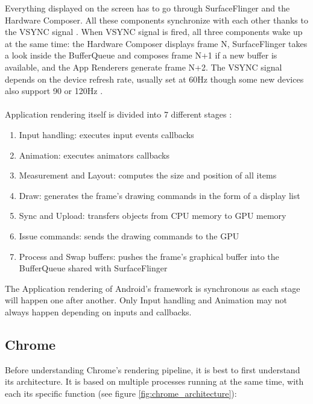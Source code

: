 \documentclass{kththesis}
\begin{document}

Everything displayed on the screen has to go through SurfaceFlinger and the Hardware Composer.
All these components synchronize with each other thanks to the VSYNC signal \cite{vsync}. When VSYNC signal is fired, all three components wake up at the same time: the Hardware Composer displays frame N, SurfaceFlinger takes a look inside the BufferQueue and composes frame N+1 if a new buffer is available, and the App Renderers generate frame N+2. The VSYNC signal depends on the device refresh rate, usually set at 60Hz though some new devices also support 90 or 120Hz \cite{refresh_rate}.

\paragraph{}
Application rendering itself is divided into 7 different stages \cite{app_rendering}:
\begin{enumerate}
    \item Input handling: executes input events callbacks
    \item Animation: executes animators callbacks
    \item Measurement and Layout: computes the size and position of all items
    \item Draw: generates the frame's drawing commands in the form of a display list
    \item Sync and Upload: transfers objects from CPU memory to GPU memory
    \item Issue commands: sends the drawing commands to the GPU
    \item Process and Swap buffers: pushes the frame's graphical buffer into the BufferQueue shared with SurfaceFlinger
\end{enumerate}

The Application rendering of Android's framework is synchronous as each stage will happen one after another. Only Input handling and Animation may not always happen depending on inputs and callbacks.

\subsection{Chrome}
Before understanding Chrome's rendering pipeline, it is best to first understand its architecture. It is based on multiple processes running at the same time, with each its specific function \cite{chrome_architecture} (see figure \ref{fig:chrome_architecture}):
\end{document}
